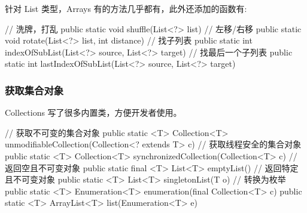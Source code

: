针对 List 类型，Arrays 有的方法几乎都有，此外还添加的函数有:

\begin{Java}
// 洗牌，打乱
public static void shuffle(List<?> list)
// 左移/右移
public static void rotate(List<?> list, int distance)
// 找子列表
public static int indexOfSubList(List<?> source, List<?> target)
// 找最后一个子列表
public static int lastIndexOfSubList(List<?> source, List<?> target)
\end{Java}

\subsubsection*{获取集合对象}

Collections 写了很多内置类，方便开发者使用。

\begin{Java}
// 获取不可变的集合对象
public static <T> Collection<T> unmodifiableCollection(Collection<? extends T> c)
// 获取线程安全的集合对象
public static <T> Collection<T> synchronizedCollection(Collection<T> c)
// 返回空且不可变对象
public static final <T> List<T> emptyList()
// 返回特定且不可变对象
public static <T> List<T> singletonList(T o)
// 转换为枚举
public static <T> Enumeration<T> enumeration(final Collection<T> c)
public static <T> ArrayList<T> list(Enumeration<T> e)
\end{Java}

\newpage